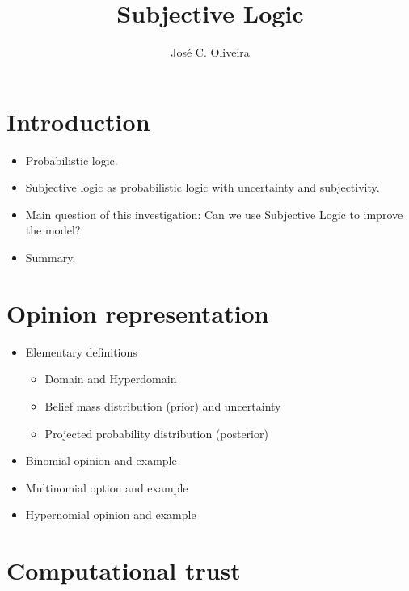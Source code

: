 \documentclass[a4paper,12pt]{article}
\title{Subjective Logic}
\author{José C. Oliveira}
\theoremstyle{definition}
\numberwithin{equation}{section}
\begin{document}
\maketitle

\section{Introduction}

\begin{itemize}
	\item Probabilistic logic.
	
	\item Subjective logic as probabilistic logic with uncertainty and subjectivity.
	
	\item Main question of this investigation: Can we use Subjective Logic to improve the model?
	
	\item Summary.
\end{itemize}

\section{Opinion representation}

\begin{itemize}
	\item Elementary definitions
	
	\begin{itemize}
		\item Domain and Hyperdomain
		
		\item Belief mass distribution (prior) and uncertainty
		
		\item Projected probability distribution (posterior)
	\end{itemize}
	
	\item Binomial opinion and example
	
	\item Multinomial option and example
	
	\item Hypernomial opinion and example
	
\end{itemize}

\section{Computational trust}
\end{document}
